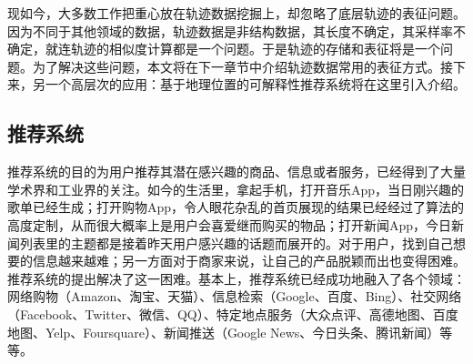 现如今，大多数工作把重心放在轨迹数据挖掘上，却忽略了底层轨迹的表征问题。因为不同于其他领域的数据，轨迹数据是非结构数据，其长度不确定，其采样率不确定，就连轨迹的相似度计算都是一个问题。于是轨迹的存储和表征将是一个问题。为了解决这些问题，本文将在下一章节中介绍轨迹数据常用的表征方式。接下来，另一个高层次的应用：基于地理位置的可解释性推荐系统将在这里引入介绍。

\subsection{推荐系统}
推荐系统的目的为用户推荐其潜在感兴趣的商品、信息或者服务，已经得到了大量学术界和工业界的关注。如今的生活里，拿起手机，打开音乐App，当日刚兴趣的歌单已经生成；打开购物App，令人眼花杂乱的首页展现的结果已经经过了算法的高度定制，从而很大概率上是用户会喜爱继而购买的物品；打开新闻App，今日新闻列表里的主题都是接着昨天用户感兴趣的话题而展开的。对于用户，找到自己想要的信息越来越难；另一方面对于商家来说，让自己的产品脱颖而出也变得困难。推荐系统的提出解决了这一困难。基本上，推荐系统已经成功地融入了各个领域：网络购物（Amazon、淘宝、天猫）、信息检索（Google、百度、Bing）、社交网络（Facebook、Twitter、微信、QQ）、特定地点服务（大众点评、高德地图、百度地图、Yelp、Foursquare）、新闻推送（Google News、今日头条、腾讯新闻）等等。

